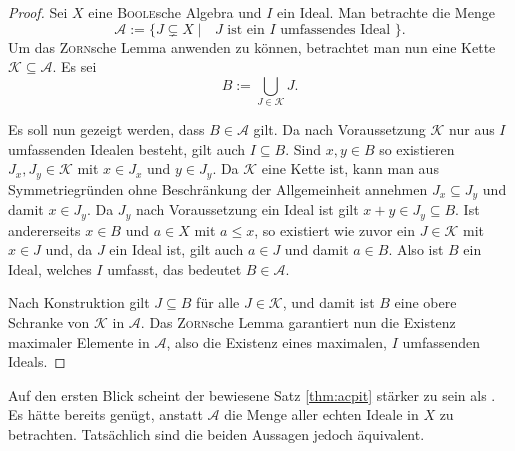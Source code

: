 \begin{proof}
  Sei $X$ eine \textsc{Boole}sche Algebra und $I$ ein Ideal. 
  Man betrachte die Menge
  \begin{displaymath}
    \mathcal{A} := \{J \subsetneq X \mid \text{ $J$ ist ein $I$ umfassendes Ideal } \}.
  \end{displaymath}
  Um das \textsc{Zorn}sche Lemma anwenden zu können, betrachtet man nun eine Kette $\mathcal{K} \subseteq \mathcal{A}$.
  Es sei 
  \begin{displaymath}
    B := \bigcup_{J \in \mathcal{K}} J.
  \end{displaymath}

  Es soll nun gezeigt werden, dass $B \in \mathcal{A}$ gilt.
  Da nach Voraussetzung $\mathcal{K}$ nur aus $I$ umfassenden Idealen besteht, gilt auch $I \subseteq B$.
  Sind $x,y \in B$ so existieren $J_x, J_y \in \mathcal{K}$ mit $x \in J_x$ und $y \in J_y$.
  Da $\mathcal{K}$ eine Kette ist, kann man aus Symmetriegründen ohne Beschränkung der Allgemeinheit annehmen $J_x \subseteq J_y$ und damit $x \in J_y$.
  Da $J_y$ nach Voraussetzung ein Ideal ist gilt $x + y \in J_y \subseteq B$.
  Ist andererseits $x \in B$ und $a \in X$ mit $a \leq x$, so existiert wie zuvor ein $J \in \mathcal{K}$ mit $x \in J$ und, da $J$ ein Ideal ist, gilt auch $a \in J$ und damit $a \in B$.
  Also ist $B$ ein Ideal, welches $I$ umfasst, das bedeutet $B \in \mathcal{A}$.

  Nach Konstruktion gilt $J \subseteq B$ für alle $J \in \mathcal{K}$, und damit ist $B$ eine obere Schranke von $\mathcal{K}$ in $\mathcal{A}$.
  Das \textsc{Zorn}sche Lemma garantiert nun die Existenz maximaler Elemente in $\mathcal{A}$, also die Existenz eines maximalen, $I$ umfassenden Ideals.
\end{proof}

\begin{bem}
  Auf den ersten Blick scheint der bewiesene Satz \ref{thm:acpit} stärker zu sein als \PIT.
  Es hätte bereits genügt, anstatt $\mathcal{A}$ die Menge aller echten Ideale in $X$ zu betrachten.
  Tatsächlich sind die beiden Aussagen jedoch äquivalent.
\end{bem}

